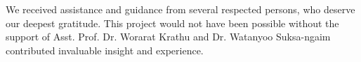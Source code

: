 \begin{acknowledgements}
\par
We received assistance and guidance from several respected persons, who deserve our deepest gratitude. This project would not have been possible without the support of Asst. Prof. Dr. Worarat Krathu and Dr. Watanyoo Suksa-ngaim contributed invaluable insight and experience.
\end{acknowledgements}